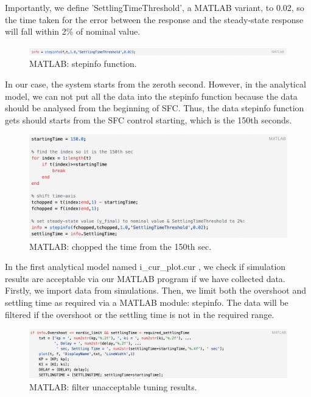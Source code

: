 Importantly, we define 'SettlingTimeThreshold', a MATLAB variant, to 0.02, so the time taken for the error between the response and the steady-state response will fall within 2\% of nominal value. 

\begin{figure}[htbp]
\centering
\includegraphics[width = .999\textwidth]{figure/3_4_2_code4.png}
\caption{MATLAB: stepinfo function.}
\label{3_4_2_code4}
\end{figure}

In our case, the system starts from the zeroth second. However, in the analytical model, we can not put all the data into the stepinfo function because the data should be analysed from the beginning of SFC. Thus, the data stepinfo function gets should starts from the SFC control starting, which is the 150th seconds.  

\begin{figure}[htbp]
\centering
\includegraphics[width = .999\textwidth]{figure/3_4_2_chopped.png}
\caption{MATLAB: chopped the time from the 150th sec.}
\label{3_4_2_chopped}
\end{figure}


In the first analytical model named i\_cur\_plot.cur , we check if simulation results are acceptable via our MATLAB program if we have collected data. Firstly, we import data from simulations. Then, we limit both the overshoot and settling time as required via a MATLAB module: stepinfo. The data will be filtered if the overshoot or the settling time is not in the required range. 

\begin{figure}[htbp]
\centering
\includegraphics[width = .999\textwidth]{figure/3_4_2_code5.png}
\caption{MATLAB: filter unacceptable tuning results.}
\label{3_4_2_code5}
\end{figure}


